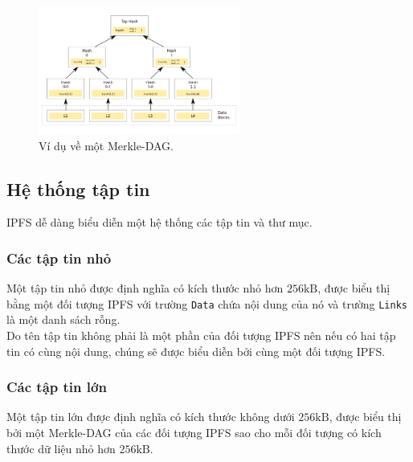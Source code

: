 \begin{figure}[!ht]
    \centering
    \includegraphics[width=250px]{anh/ipfs/merkle-tree.png}
    \caption{Ví dụ về một Merkle-DAG.}
\end{figure}

\subsection{Hệ thống tập tin}

IPFS dễ dàng biểu diễn một hệ thống các tập tin và thư mục.

\subsubsection*{Các tập tin nhỏ}

Một tập tin nhỏ được định nghĩa có kích thước nhỏ hơn $256\mathrm{kB}$, được biểu thị bằng một đối tượng IPFS với trường \texttt{Data} chứa nội dung của nó và trường \texttt{Links} là một danh sách rỗng.\\

Do tên tập tin không phải là một phần của đối tượng IPFS nên nếu có hai tập tin có cùng nội dung, chúng sẽ được biểu diễn bởi cùng một đối tượng IPFS.

\subsubsection*{Các tập tin lớn}

Một tập tin lớn được định nghĩa có kích thước không dưới $256\mathrm{kB}$, được biểu thị bởi một Merkle-DAG của các đối tượng IPFS sao cho mỗi đối tượng có kích thước dữ liệu nhỏ hơn $256\mathrm{kB}$.\\
